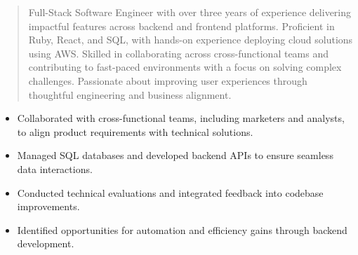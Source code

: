 



\makecvheader

\begin{quote}
  \noindent
  Full-Stack Software Engineer with over three years of experience delivering impactful features across backend and frontend platforms. Proficient in Ruby, React, and SQL, with hands-on experience deploying cloud solutions using AWS. Skilled in collaborating across cross-functional teams and contributing to fast-paced environments with a focus on solving complex challenges. Passionate about improving user experiences through thoughtful engineering and business alignment.
\end{quote}

\par\smallskip
\noindent
\begin{minipage}{20cm}
  \begin{minipage}{9.75cm}
    \begin{itemize}
      \item Collaborated with cross-functional teams, including marketers and analysts, to align product requirements with technical solutions.
      \item Managed SQL databases and developed backend APIs to ensure seamless data interactions.
    \end{itemize}
  \end{minipage}
  \hfill
  \begin{minipage}{9.75cm}
    \begin{itemize}
      \item Conducted technical evaluations and integrated feedback into codebase improvements.
      \item Identified opportunities for automation and efficiency gains through backend development.
    \end{itemize}
  \end{minipage}
\end{minipage}
\par\smallskip
\divider

